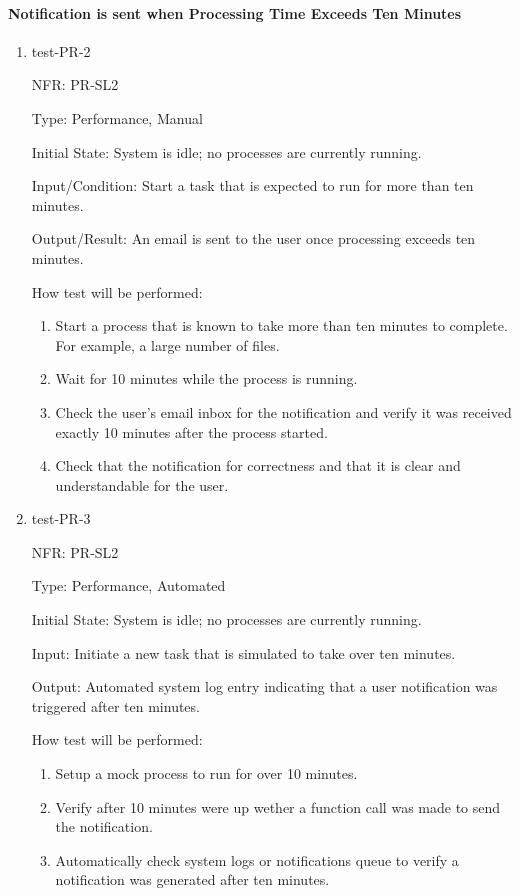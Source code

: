 \documentclass[12pt, titlepage]{article}
\begin{document}
\paragraph{Notification is sent when Processing Time Exceeds Ten Minutes}
\begin{enumerate}
  \item{test-PR-2}

  NFR: PR-SL2

  Type: Performance, Manual
            
  Initial State: System is idle; no processes are currently running.
            
  Input/Condition: Start a task that is expected to run for more than ten minutes.
            
  Output/Result: An email is sent to the user once processing exceeds ten minutes.
            
  How test will be performed: 
  \begin{enumerate}
    \item Start a process that is known to take more than ten minutes to complete. For example, a large number of files.
    \item Wait for 10 minutes while the process is running.
    \item Check the user's email inbox for the notification and verify it was received exactly 10 minutes after the process started.
    \item Check that the notification for correctness and that it is clear and understandable for the user.
  \end{enumerate}

  \item{test-PR-3}

  NFR: PR-SL2

  Type: Performance, Automated
            
  Initial State: System is idle; no processes are currently running.
            
  Input: Initiate a new task that is simulated to take over ten minutes.
            
  Output: Automated system log entry indicating that a user notification was triggered after ten minutes.
            
  How test will be performed: 
  \begin{enumerate}
    \item {Setup a mock process to run for over 10 minutes.}
    \item {Verify after 10 minutes were up wether a function call was made to send the notification.}
    \item {Automatically check system logs or notifications queue to verify a notification was generated after ten minutes.}
  \end{enumerate}
\end{enumerate}
\end{document}

